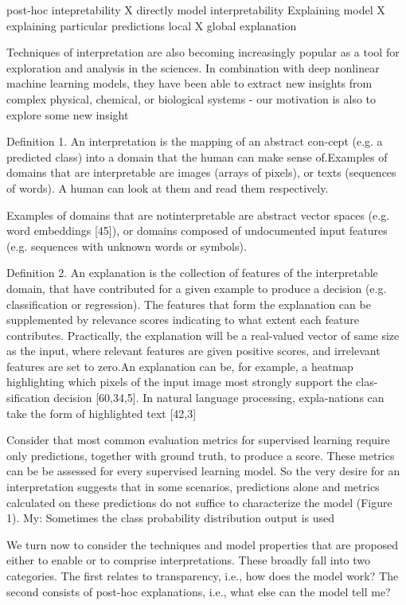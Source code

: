 post-hoc intepretability X directly model interpretability
Explaining model X explaining particular predictions
local X global explanation

\cite{Montavon2018}
Techniques of interpretation are also becoming increasingly popular as a tool for exploration and analysis in the sciences. In combination with deep nonlinear machine learning models, they have been able to extract new insights from complex physical, chemical, or biological systems - our motivation is also to explore some new insight

Definition 1. An interpretation is the mapping of an abstract con-cept (e.g. a predicted class) into a domain that the human can make sense of.Examples of domains that are interpretable are images (arrays of pixels), or texts (sequences of words). A human can look at them and read them respectively. 

Examples of domains that are notinterpretable are abstract vector spaces (e.g. word embeddings [45]), or domains composed of undocumented input features (e.g. sequences with unknown words or symbols).

Definition 2. An explanation is the collection of features of the interpretable domain, that have contributed for a given example to produce a decision (e.g. classification or regression).
The features that form the explanation can be supplemented by relevance scores indicating to what extent each feature contributes. Practically, the explanation will be a real-valued vector of same size as the input, where relevant features are given positive scores, and irrelevant features are set to zero.An explanation can be, for example, a heatmap highlighting which pixels of the input image most strongly support the clas-sification decision [60,34,5]. In natural language processing, expla-nations can take the form of highlighted text [42,3]

\cite{Lipton2016}
Consider that most common evaluation metrics for supervised learning require only predictions, together with
ground truth, to produce a score. These metrics can be
be assessed for every supervised learning model. So the
very desire for an interpretation suggests that in some scenarios, predictions alone and metrics calculated on these
predictions do not suffice to characterize the model (Figure
1). 
My: Sometimes the class probability distribution output is used

We turn now to consider the techniques and model properties that are proposed either to enable or to comprise interpretations. These broadly fall into two categories. The first
relates to transparency, i.e., how does the model work? The
second consists of post-hoc explanations, i.e., what else
can the model tell me? 

